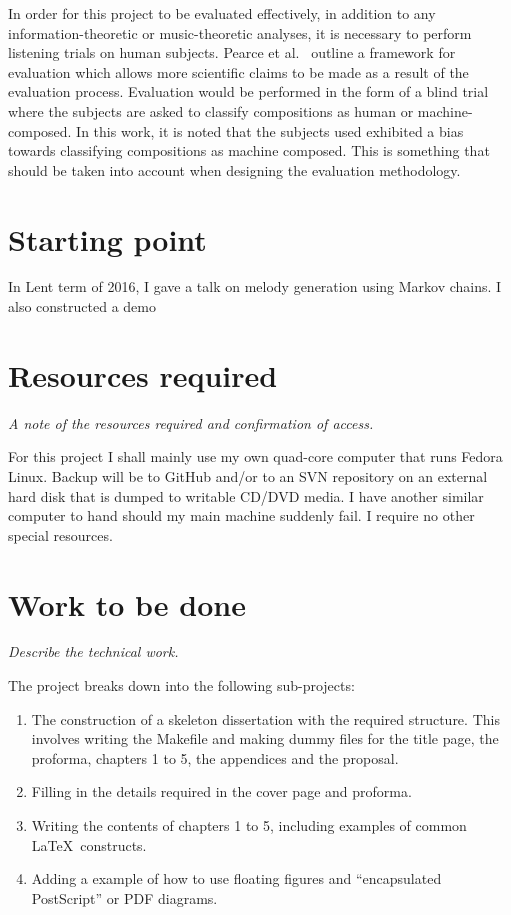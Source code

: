 \documentclass[12pt,a4paper,twoside]{article}
\begin{document}
In order for this project to be evaluated effectively, in addition to any information-theoretic or music-theoretic analyses, it is necessary to perform listening trials on human subjects. Pearce et al.\ \cite{pearce2001evaluation} outline a framework for evaluation which allows more scientific claims to be made as a result of the evaluation process. Evaluation would be performed in the form of a blind trial where the subjects are asked to classify compositions as human or machine-composed. In this work, it is noted that the subjects used exhibited a bias towards classifying compositions as machine composed. This is something that should be taken into account when designing the evaluation methodology.

\section*{Starting point}

In Lent term of 2016, I gave a talk on melody generation using Markov chains. I also constructed a demo

\section*{Resources required}

\emph{A note of the resources required and confirmation of access.}

For this project I shall mainly use my own quad-core computer that
runs Fedora Linux. Backup will be to GitHub and/or to an SVN
repository on an external hard disk that is dumped to writable CD/DVD
media. I have another similar computer to hand should my main machine
suddenly fail. I require no other special resources.

\section*{Work to be done}

\emph{Describe the technical work.}

The project breaks down into the following sub-projects:

\begin{enumerate}

\item The construction of a skeleton dissertation with the required
  structure. This involves writing the Makefile and making dummy
  files for the title page, the proforma, chapters 1 to 5, the
  appendices and the proposal.

\item Filling in the details required in the cover page and proforma.

\item Writing the contents of chapters 1 to 5, including examples of
  common \LaTeX\ constructs.

\item Adding a example of how to use floating figures and ``encapsulated
  PostScript'' or PDF diagrams.

\end{enumerate}
\end{document}
